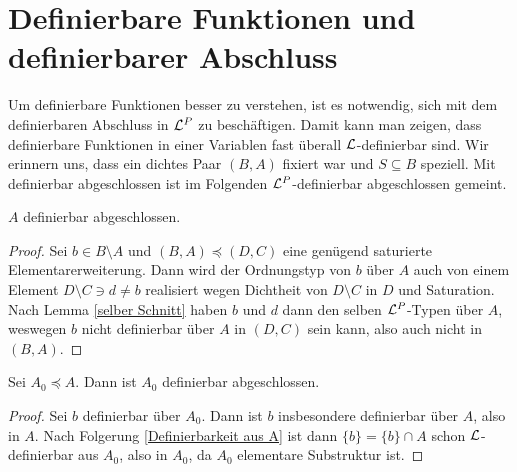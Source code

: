 \section{Definierbare Funktionen und definierbarer Abschluss}
Um definierbare Funktionen besser zu verstehen, ist es notwendig, sich mit dem definierbaren Abschluss in $\mathcal{L}^P$ zu beschäftigen. Damit kann man zeigen, dass definierbare Funktionen in einer Variablen \glqq{}fast überall\grqq{} $\mathcal{L}$-definierbar sind. Wir erinnern uns, dass ein dichtes Paar $(B,A)$ fixiert war und $S\subseteq B$ speziell. Mit \glqq{}definierbar abgeschlossen\grqq{} ist im Folgenden \glqq{}$\mathcal{L}^P$-definierbar abgeschlossen\grqq{} gemeint.

\begin{lemma}\label{A definierbar abgeschl}
	$A$ definierbar abgeschlossen.
\end{lemma}
\begin{proof}
	Sei $b\in B\setminus A$ und $(B,A)\preceq(D,C)$ eine genügend saturierte Elementarerweiterung. Dann wird der Ordnungstyp von $b$ über $A$ auch von einem Element $D\setminus C\ni d\neq b$ realisiert wegen Dichtheit von $D\setminus C$ in $D$ und Saturation.\\
	Nach Lemma \ref{selber Schnitt} haben $b$ und $d$ dann den selben $\mathcal{L}^P$-Typen über $A$, weswegen $b$ nicht definierbar über $A$ in $(D,C)$ sein kann, also auch nicht in $(B,A)$.
\end{proof}

\begin{corollary}
	Sei $A_0\preceq A$. Dann ist $A_0$ definierbar abgeschlossen.
\end{corollary}
\begin{proof}
	Sei $b$ definierbar über $A_0$. Dann ist $b$ insbesondere definierbar über $A$, also in $A$. Nach Folgerung \ref{Definierbarkeit aus A} ist dann $\{b\}=\{b\}\cap A$ schon $\mathcal{L}$-definierbar aus $A_0$, also in $A_0$, da $A_0$ elementare Substruktur ist.
\end{proof}

